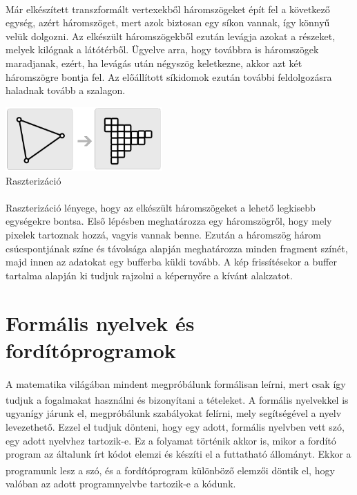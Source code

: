 \documentclass[12pt]{report}
\begin{document}
\paragraph{}
Már elkészített transzformált vertexekből háromszögeket épít fel a következő egység, azért háromszöget, mert azok biztosan egy síkon vannak, így könnyű velük dolgozni. Az elkészült háromszögekből ezután levágja azokat a részeket, melyek kilógnak a látótérből. Ügyelve arra, hogy továbbra is háromszögek maradjanak, ezért, ha levágás után négyszög keletkezne, akkor azt két háromszögre bontja fel. Az előállított síkidomok ezután további feldolgozásra haladnak tovább a szalagon.
\begin{center}
\includegraphics[width=6cm]{pics/rasterization}\\
{\footnotesize Raszterizáció}
\end{center}
\paragraph{}
Raszterizáció lényege, hogy az elkészült háromszögeket a lehető legkisebb egységekre bontsa. Első lépésben meghatározza egy háromszögről, hogy mely pixelek tartoznak hozzá, vagyis vannak benne. Ezután a háromszög három csúcspontjának színe és távolsága alapján meghatározza minden fragment színét, majd innen az adatokat egy bufferba küldi tovább. A kép frissítésekor a buffer tartalma alapján ki tudjuk rajzolni a képernyőre a kívánt alakzatot.

\section{Formális nyelvek és fordítóprogramok}
\paragraph{}
A matematika világában mindent megpróbálunk formálisan leírni, mert csak így tudjuk a fogalmakat használni és bizonyítani a tételeket. A formális nyelvekkel\textsuperscript{\cite{fonya}} is ugyanígy járunk el, megpróbálunk szabályokat felírni, mely segítségével a nyelv levezethető. Ezzel el tudjuk dönteni, hogy egy adott, formális nyelvben vett szó, egy adott nyelvhez tartozik-e. Ez a folyamat történik akkor is, mikor a fordító program az általunk írt kódot elemzi és készíti el a futtatható állományt. Ekkor a programunk lesz a szó, és a fordítóprogram\textsuperscript{\cite{fordprog}} különböző elemzői döntik el, hogy valóban az adott programnyelvbe tartozik-e a kódunk.
\end{document}
